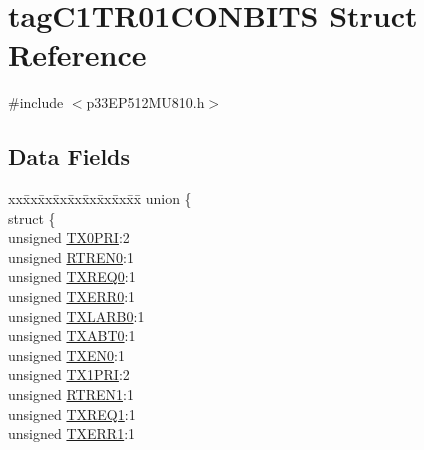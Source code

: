 \hypertarget{structtag_c1_t_r01_c_o_n_b_i_t_s}{}\section{tag\+C1\+T\+R01\+C\+O\+N\+B\+I\+TS Struct Reference}
\label{structtag_c1_t_r01_c_o_n_b_i_t_s}


{\ttfamily \#include $<$p33\+E\+P512\+M\+U810.\+h$>$}

\subsection*{Data Fields}
\begin{DoxyCompactItemize}
\item 
\begin{tabbing}
xx\=xx\=xx\=xx\=xx\=xx\=xx\=xx\=xx\=\kill
union \{\\
\>struct \{\\
\>\>unsigned \hyperlink{structtag_c1_t_r01_c_o_n_b_i_t_s_a9c9cb40940fea7bd19219f6b51374e0e}{TX0PRI}:2\\
\>\>unsigned \hyperlink{structtag_c1_t_r01_c_o_n_b_i_t_s_a25119151e27cc975097779e0656b2ae3}{RTREN0}:1\\
\>\>unsigned \hyperlink{structtag_c1_t_r01_c_o_n_b_i_t_s_af1df88e53ab7e28b18741e1a0a1fbcd7}{TXREQ0}:1\\
\>\>unsigned \hyperlink{structtag_c1_t_r01_c_o_n_b_i_t_s_a249dd262057f7b57dbf403ace998f248}{TXERR0}:1\\
\>\>unsigned \hyperlink{structtag_c1_t_r01_c_o_n_b_i_t_s_a5aa1b6d21403bf98f2c2429987488dad}{TXLARB0}:1\\
\>\>unsigned \hyperlink{structtag_c1_t_r01_c_o_n_b_i_t_s_ad9ec9acbf73740bb2cec60618b27c3c8}{TXABT0}:1\\
\>\>unsigned \hyperlink{structtag_c1_t_r01_c_o_n_b_i_t_s_a52d055e701b7924e51ddc82b3bb62262}{TXEN0}:1\\
\>\>unsigned \hyperlink{structtag_c1_t_r01_c_o_n_b_i_t_s_aa3dce2acdb2adeff30ef611cf72fcc20}{TX1PRI}:2\\
\>\>unsigned \hyperlink{structtag_c1_t_r01_c_o_n_b_i_t_s_ac17f546c2a70389e527c36f92818806e}{RTREN1}:1\\
\>\>unsigned \hyperlink{structtag_c1_t_r01_c_o_n_b_i_t_s_a68518d5d2618c8ec06a28b757b066c17}{TXREQ1}:1\\
\>\>unsigned \hyperlink{structtag_c1_t_r01_c_o_n_b_i_t_s_a9c2b4ca0992eeeced937d55813e4e639}{TXERR1}:1\\

\end{tabbing}
\end{DoxyCompactItemize}
